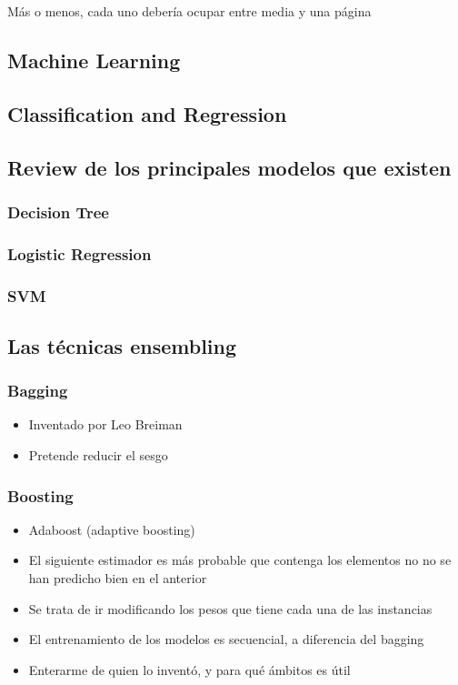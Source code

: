 Más o menos, cada uno debería ocupar entre media y una página
\subsection{Machine Learning}
\subsection{Classification and Regression}
\subsection{Review de los principales modelos que existen}
\subsubsection{Decision Tree}
\subsubsection{Logistic Regression}
\subsubsection{SVM}
\subsection{Las técnicas ensembling}
\subsubsection{Bagging}
\begin{itemize}
 \item Inventado por Leo Breiman
 \item Pretende reducir el sesgo
\end{itemize}
\subsubsection{Boosting}
\begin{itemize}
 \item Adaboost (adaptive boosting)
 \item El siguiente estimador es más probable que contenga los elementos no
       no se han predicho bien en el anterior
 \item Se trata de ir modificando los pesos que tiene cada una de las instancias
 \item El entrenamiento de los modelos es secuencial, a diferencia del bagging
 \item Enterarme de quien lo inventó, y para qué ámbitos es útil
\end{itemize}
